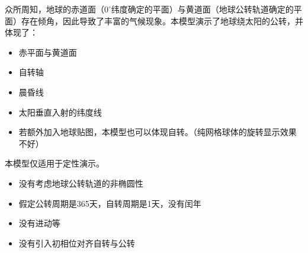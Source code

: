 
众所周知，地球的赤道面（$0 ^\circ$纬度确定的平面）与黄道面（地球公转轨道确定的平面）存在倾角，因此导致了丰富的气候现象。本模型演示了地球绕太阳的公转，并体现了：
\begin{itemize}
\item 赤平面与黄道面
\item 自转轴
\item 晨昏线
\item 太阳垂直入射的纬度线
\item 若额外加入地球贴图，本模型也可以体现自转。（纯网格球体的旋转显示效果不好）
\end{itemize}

本模型仅适用于定性演示。
\begin{itemize}
\item 没有考虑地球公转轨道的非椭圆性
\item 假定公转周期是365天，自转周期是1天，没有闰年
\item 没有进动等
\item 没有引入初相位对齐自转与公转
\end{itemize}

